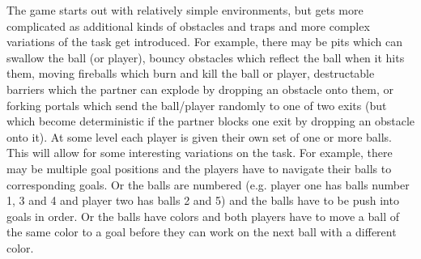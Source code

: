 
The game starts out with relatively simple environments, but gets more
complicated as additional kinds of obstacles and traps and more
complex variations of the task get introduced.  For example, there may
be pits which can swallow the ball (or player), bouncy obstacles which
reflect the ball when it hits them, moving fireballs which burn and
kill the ball or player, destructable barriers which the partner can
explode by dropping an obstacle onto them, or forking portals which
send the ball/player randomly to one of two exits (but which become
deterministic if the partner blocks one exit by dropping an obstacle
onto it).   At some level
each player is given their own set of one or more balls. This will
allow for some interesting variations on the task. For example, there
may be multiple goal positions and the players have to navigate their
balls to corresponding goals. Or the balls are numbered (e.g. player
one has balls number 1, 3 and 4 and player two has balls 2 and 5) and
the balls have to be push into goals in order. Or the balls have
colors and both players have to move a ball of the same color to a
goal before they can work on the next ball with a different color.
